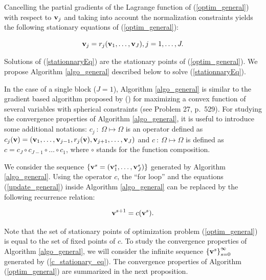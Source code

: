 \documentclass[
]{jss}
\begin{document}
Cancelling the partial gradients of the Lagrange function of
(\ref{optim_general}) with respect to \(\mathbf{v}_j\) and taking into
account the normalization constraints yields the following stationary
equations of (\ref{optim_general}):

\begin{equation}
\mathbf{v}_j = r_j(\mathbf{v}_1, \ldots,\mathbf{v}_J), j=1, \ldots, J.
\label{stationnaryEq}
\end{equation}

Solutions of (\ref{stationnaryEq}) are the stationary points of
(\ref{optim_general}). We propose Algorithm \ref{algo_general} described
below to solve (\ref{stationnaryEq}).

In the case of a single block (\(J=1\)), Algorithm \ref{algo_general} is
similar to the gradient based algorithm proposed by (\cite{Journee2010})
for maximizing a convex function of several variables with spherical
constraints (see Problem 27, p.~529). For studying the convergence
properties of Algorithm \ref{algo_general}, it is useful to introduce
some additional notations: \(c_j~:~\Omega\mapsto\Omega\) is an operator
defined as
\(c_j(\mathbf{v}) = \left(\mathbf{v}_1, \ldots, \mathbf{v}_{j-1}, r_j(\mathbf{v}), \mathbf{v}_{j+1}, \ldots, \mathbf{v}_J\right)\)
and \(c~:~\Omega\mapsto\Omega\) is defined as
\(c = c_J\circ c_{J-1}\circ \ldots \circ c_1\), where \(\circ\) stands
for the function composition.

We consider the sequence
\(\lbrace \mathbf{v}^s = \left(\mathbf{v}_1^{s}, \ldots, \mathbf{v}_J^{s} \right) \rbrace\)
generated by Algorithm \ref{algo_general}. Using the operator \(c\), the
``for loop'' and the equations (\ref{update_general}) inside Algorithm
\ref{algo_general} can be replaced by the following recurrence relation:

\begin{equation}
\mathbf{v}^{s+1} = c(\mathbf{v}^{s}).
\label{c_stationary_eq}
\end{equation}

Note that the set of stationary points of optimization problem
(\ref{optim_general}) is equal to the set of fixed points of \(c\). To
study the convergence properties of Algorithm \ref{algo_general}, we
will consider the infinite sequence
\(\left\lbrace \mathbf{v}^s \right\rbrace_{s=0}^\infty\) generated by
(\ref{c_stationary_eq}). The convergence properties of Algorithm
(\ref{optim_general}) are summarized in the next proposition.
\end{document}
